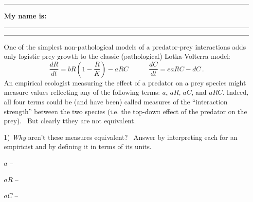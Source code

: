 \documentclass{article}
\newcommand*{\blanks}[1][4em]{\rule{#1}{.4pt}}
\begin{document}
\noindent{}

\rule[0.5ex]{\linewidth}{1pt}
\begin{center}
	\textbf{My name is:} \blanks[150pt]
\end{center}
\rule[0.5ex]{\linewidth}{1pt}

One of the simplest non-pathological models of a predator-prey interactions adds only logistic prey growth to the classic (pathological) Lotka-Volterra model:
\begin{equation*}
	\frac{dR}{dt} = b R \left ( 1 - \frac{R}{K} \right ) - a R C 
	\quad \quad \quad
	\frac{dC}{dt} = e a R C - d C \, .	
\end{equation*}
An empirical ecologist measuring the effect of a predator on a prey species might measure values reflecting any of the following terms: $a$, $a R$, $a C$, and $aRC$.  Indeed, all four terms could be (and have been) called measures of the ``interaction strength'' between the two species (i.e. the top-down effect of the predator on the prey).  But clearly tthey are not equivalent.


1) \textit{Why} aren't these measures equivalent?  Answer by interpreting each  for an empiricist and by defining it in terms of its units.

\vspace{0.1 cm}

$a$ -- 
\vspace{1.5 cm}

$aR$ --
\vspace{1.5 cm}

$aC$ --
\vspace{1.5 cm}
\end{document}
